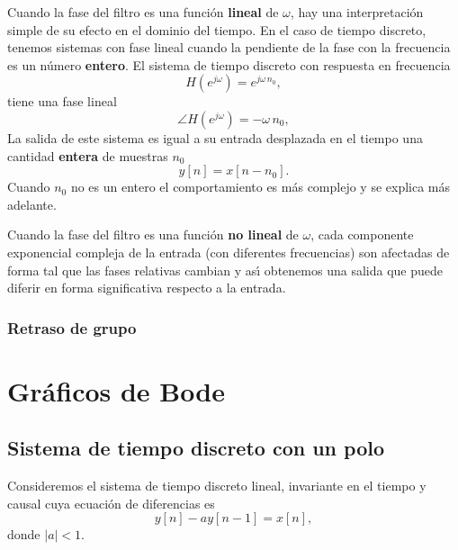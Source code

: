 Cuando la fase del filtro es una funci\'{o}n \textbf{lineal} de $\omega$, hay una interpretaci\'{o}n 
simple de su efecto en el dominio del tiempo. 
En el caso de tiempo discreto, tenemos sistemas con fase lineal cuando la pendiente de la fase con la 
frecuencia es un n\'{u}mero 
\textbf{entero}.
El sistema de tiempo discreto con respuesta en frecuencia
\begin{equation}
        H( e^{j \omega}) = e^{j \omega \, n_{0}},
\end{equation}
tiene una fase lineal 
\begin{equation}
        \angle H( e^{j \omega}) = -\omega \, n_{0},
\end{equation}
La salida de este sistema es igual a su entrada desplazada en el tiempo una cantidad \textbf{entera} de 
muestras $n_{0}$
\begin{equation}
        y[n] = x[n - n_{0}].
\end{equation}
Cuando $n_{0}$ no es un entero el comportamiento es m\'{a}s complejo y se explica m\'{a}s adelante.

Cuando la fase del filtro es una funci\'{o}n \textbf{no lineal} de $\omega$, cada componente exponencial 
compleja de la entrada (con diferentes frecuencias) son afectadas de forma tal que las fases relativas 
cambian y as\'{\i} obtenemos una salida que puede diferir en forma significativa respecto a la entrada.

\subsubsection{Retraso de grupo}

\section{Gr\'{a}ficos de Bode}

\subsection{Sistema de tiempo discreto con un polo}

Consideremos el sistema de tiempo discreto lineal, invariante en el tiempo y
causal cuya ecuaci\'{o}n de diferencias es
\begin{equation}
y\left[ n\right] -ay\left[ n-1\right] =x\left[ n\right] ,
\end{equation}
donde $\left| a\right| <1$.

